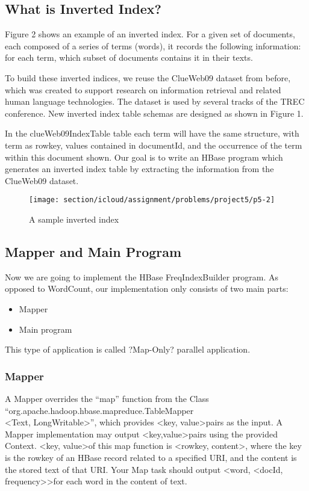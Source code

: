 \subsection*{What is Inverted Index?}
Figure 2 shows an example of an inverted index. For a given set of documents,
each composed of a series of terms (words), it records the following
information: for each term, which subset of documents contains it in their
texts.

To build these inverted indices, we reuse the ClueWeb09 dataset from before,
which was created to support research on information retrieval and related
human language technologies. The dataset is used by several tracks of the TREC
conference. New inverted index table schemas are designed as shown in Figure 1.

In the clueWeb09IndexTable table each term will have the same structure, with
term as rowkey, values contained in documentId, and the occurrence of the term
within this document shown. Our goal is to write an HBase program which
generates an inverted index table by extracting the information from the
ClueWeb09 dataset.

\begin{figure}[!htbp]
\texttt{[image: section/icloud/assignment/problems/project5/p5-2]}
\centering
\caption{A sample inverted index}
\end{figure}

\subsection*{Mapper and Main Program}
Now we are going to implement the HBase FreqIndexBuilder program. As opposed to
WordCount, our implementation only consists of two main parts:

\begin{itemize}
\item Mapper
\item Main program
\end{itemize}
This type of application is called ?Map-Only? parallel application.

\subsubsection*{Mapper}
A Mapper overrides the ``map'' function from the Class ``org.apache.hadoop.hbase.mapreduce.TableMapper\\
\textless Text, LongWritable\textgreater'', which provides \textless key, value\textgreater pairs as the input. A Mapper implementation may output \textless key,value\textgreater pairs using the provided Context.
\textless key, value\textgreater of this map function is \textless rowkey, content\textgreater, where the key is the rowkey of an HBase record related to a specified URI, and the content is the stored text of that URI. Your Map task should output \textless word, \textless docId, frequency\textgreater\textgreater for each word in the content of text.

